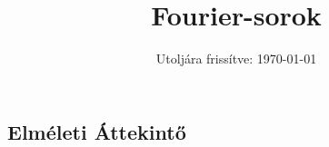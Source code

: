 \documentclass[a4paper, 12pt]{scrartcl}
\title{Fourier-sorok}
\date{Utoljára frissítve: \today}
\begin{document}
\maketitle
\subsection{Elméleti Áttekintő}


\end{document}
